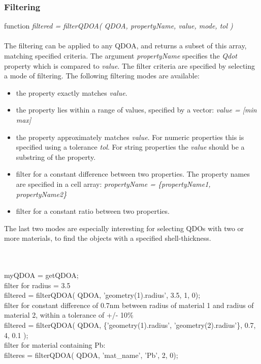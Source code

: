 \subsubsection{Filtering}
function \textit{filtered = filterQDOA( QDOA, propertyName, value, mode, tol )}\\\\
The filtering can be applied to any QDOA, and returns a subset of this array, matching specified criteria. The argument \textit{propertyName} specifies the \textit{Qdot} property which is compared to \textit{value}. The filter criteria are specified by selecting a mode of filtering. 
The following filtering modes are available:\\
\begin{itemize}
\item the property exactly matches \textit{value}.
\item the property lies within a range of values, specified by a vector: \textit{value = [min max]}
\item the property approximately matches \textit{value}. For numeric properties this is specified using a tolerance \textit{tol}. For string properties the \textit{value} should be a substring of the property.
\item filter for a constant difference between two properties. The property names are specified in a cell array: \textit{propertyName = \{propertyName1, propertyName2\}}
\item filter for a constant ratio between two properties.
\end{itemize}
The last two modes are especially interesting for selecting QDOs with two or more materials, to find the objects with a specified shell-thickness.\\
\\
\begin{EXAMPLE}\end{EXAMPLE}
\\myQDOA = getQDOA;\\
filter for radius = 3.5 \\
filtered = filterQDOA( QDOA, 'geometry(1).radius',  3.5, 1, 0);\\
filter for constant difference of 0.7nm between radius of material 1 and radius of material 2, within a tolerance of +/- 10\%\\
filtered = filterQDOA( QDOA, \{'geometry(1).radius', 'geometry(2).radius'\}, 0.7, 4, 0.1 );\\
filter for material containing Pb:\\
filteres = filterQDOA( QDOA, 'mat\_name', 'Pb', 2, 0);\\


